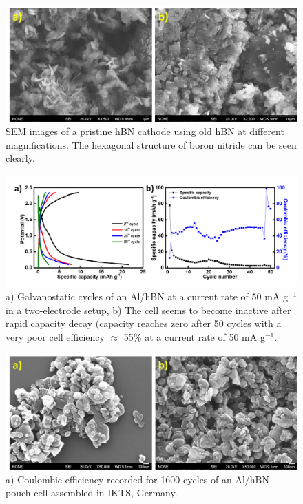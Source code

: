 \begin{figure}[tbh!]
\centering
\includegraphics[width=\textwidth]{Figures/BOhBN/hBNSEM}
\caption{SEM images of a pristine hBN cathode using old hBN at different magnifications. The hexagonal structure of boron nitride can be seen clearly.}
\label{Figures/BOhBN:hBNSEM}
\end{figure}
\begin{figure}[tbh!]
\centering
\includegraphics[width=\textwidth]{Figures/BOhBN/BNNSCDCCE}
\caption{a) Galvanostatic cycles of an Al/hBN at a current rate of 50 mA g$^{-1}$ in a two-electrode setup, b) The cell seems to become inactive after rapid capacity decay (capacity reaches zero after 50 cycles with a very poor cell efficiency $\approx$ 55\% at a current rate of 50 mA g$^{-1}$.}
\label{Figures/BOhBN:hBNCDCCE}
\end{figure}
\begin{figure}[tbh!]
\centering
\includegraphics[width=\textwidth]{Figures/BOhBN/BNNSSEM}
\caption{a) Coulombic efficiency recorded for 1600 cycles of an Al/hBN pouch cell assembled in IKTS, Germany.}
\label{Figures/BOhBN:BNNSSEM}
\end{figure}
